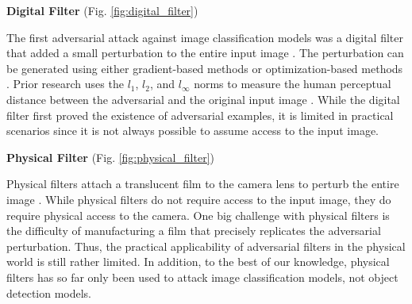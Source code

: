 \textbf{Digital Filter} (Fig. \ref{fig:digital_filter})

The first adversarial attack against image classification models was a digital filter that added a small perturbation to the entire input image \citep{goodfellow2014explaining}. The perturbation can be generated using either gradient-based methods \citep{madryMSTV18} \citep{kurakin2018adversarial} \citep{wong2019wasserstein} \citep{croce2020reliable} or optimization-based methods \citep{papernot2016transferability} \citep{carlini2017towards} \citep{qin2019imperceptible}. Prior research uses the $l_1$, $l_2$, and $l_{\infty}$ norms to measure the human perceptual distance between the adversarial and the original input image \citep{miyato2015distributional} \citep{sabour2015adversarial} \citep{chen2018ead}. While the digital filter first proved the existence of adversarial examples, it is limited in practical scenarios since it is not always possible to assume access to the input image.

\textbf{Physical Filter} (Fig. \ref{fig:physical_filter})

Physical filters attach a translucent film to the camera lens to perturb the entire image \citep{li2019adversarial}. While physical filters do not require access to the input image, they do require physical access to the camera. One big challenge with physical filters is the difficulty of manufacturing a film that precisely replicates the adversarial perturbation. Thus, the practical applicability of adversarial filters in the physical world is still rather limited. In addition, to the best of our knowledge, physical filters has so far only been used to attack image classification models, not object detection models. 


